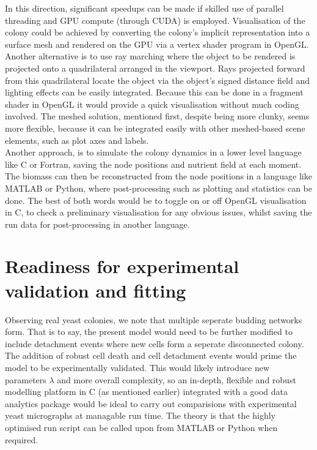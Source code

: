 In this direction, significant speedups can be made if skilled use of 
parallel threading and GPU compute (through CUDA) is employed. Visualisation 
of the colony could be achieved by converting the colony's
implicit representation into a surface mesh and rendered on the GPU
via a vertex shader program in OpenGL. Another alternative 
is to use ray marching where the object to be rendered is projected 
onto a quadrilateral arranged in the viewport. Rays
projected forward from this quadrilateral locate the object via 
the object's signed distance field and lighting effects can
be easily integrated. Because 
this can be done in a fragment shader in OpenGL it 
would provide a quick visualisation without much 
coding involved. The meshed solution, mentioned first,
despite being more clunky, seems more flexible,
because it can be integrated easily with other meshed-based
scene elements, such as plot axes and labels.
\\

Another approach, is to simulate the colony dynamics in a lower 
level language like C or Fortran, saving the node positions and nutrient 
field at each moment. The biomass can then be reconstructed
from the node positions in a language like MATLAB or Python,
where post-processing such as plotting and statistics can be done.
The best of both words would be to toggle on or off 
OpenGL visualisation in C, to check a
preliminary visualisation for any obvious issues, whilst saving 
the run data for post-processing in another language.





\section{Readiness for experimental validation and fitting}\label{expFitting}
Observing real yeast colonies, we note that multiple
seperate budding networks form. That is to say,
the present model would need to be further modified 
to include detachment events where new cells form a 
seperate disconnected colony.
\\

The addition of robust cell death and cell detachment events would 
prime the model to be experimentally validated. This 
would likely introduce new parameters $\lambda$ and more 
overall complexity, so an in-depth, flexible and robust modelling platform 
in C (as mentioned earlier) integrated with a good data analytics package 
would be ideal to carry out comparisions with experimental yeast micrographs
at managable run time. The theory is that the highly optimised run 
script can be called upon from MATLAB or Python when required.
\\

